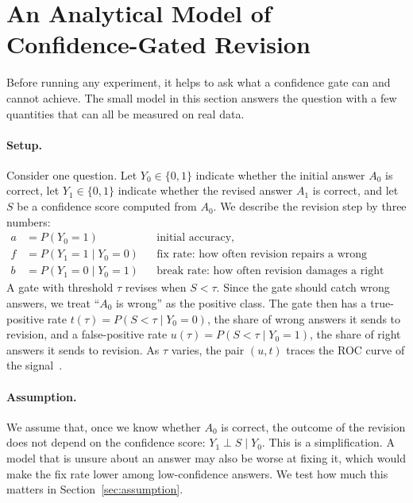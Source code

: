 \section{An Analytical Model of Confidence-Gated Revision}
\label{sec:theory}

Before running any experiment, it helps to ask what a confidence gate can and cannot achieve. The small model in this section answers the question with a few quantities that can all be measured on real data.

\paragraph{Setup.} Consider one question. Let $Y_0\in\{0,1\}$ indicate whether the initial answer $A_0$ is correct, let $Y_1\in\{0,1\}$ indicate whether the revised answer $A_1$ is correct, and let $S$ be a confidence score computed from $A_0$. We describe the revision step by three numbers:
\begin{align*}
a &= P(Y_0=1) && \text{initial accuracy,}\\
f &= P(Y_1=1 \mid Y_0=0) && \text{fix rate: how often revision repairs a wrong answer,}\\
b &= P(Y_1=0 \mid Y_0=1) && \text{break rate: how often revision damages a right answer.}
\end{align*}
A gate with threshold $\tau$ revises when $S<\tau$. Since the gate should catch wrong answers, we treat ``$A_0$ is wrong'' as the positive class. The gate then has a true-positive rate $t(\tau)=P(S<\tau\mid Y_0=0)$, the share of wrong answers it sends to revision, and a false-positive rate $u(\tau)=P(S<\tau\mid Y_0=1)$, the share of right answers it sends to revision. As $\tau$ varies, the pair $(u,t)$ traces the ROC curve of the signal~\cite{fawcett2006roc}.

\paragraph{Assumption.} We assume that, once we know whether $A_0$ is correct, the outcome of the revision does not depend on the confidence score: $Y_1 \perp S \mid Y_0$. This is a simplification. A model that is unsure about an answer may also be worse at fixing it, which would make the fix rate lower among low-confidence answers. We test how much this matters in Section~\ref{sec:assumption}.

